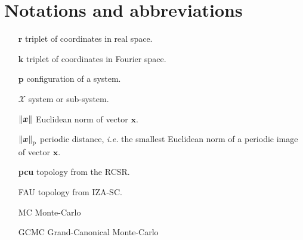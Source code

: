\section*{Notations and abbreviations}
\begin{itemize}
    \item[$\boldsymbol r$] triplet of coordinates in real space.
    \item[$\boldsymbol k$] triplet of coordinates in Fourier space.
    \item[$\boldsymbol p$] configuration of a system.
    \item[$\mathcal X$] system or sub-system.
    \item[$\left\|\boldsymbol x\right\|$] Euclidean norm of vector $\boldsymbol x$.
    \item[$\left\|\boldsymbol x\right\|_\text{p}$] periodic distance, \textit{i.e.} the smallest Euclidean norm of a periodic image of vector $\boldsymbol x$.
    \item[\bfseries{pcu}] topology from the RCSR.
    \item[FAU] topology from IZA-SC.
    \item[MC] Monte-Carlo
    \item[GCMC] Grand-Canonical Monte-Carlo
\end{itemize}
